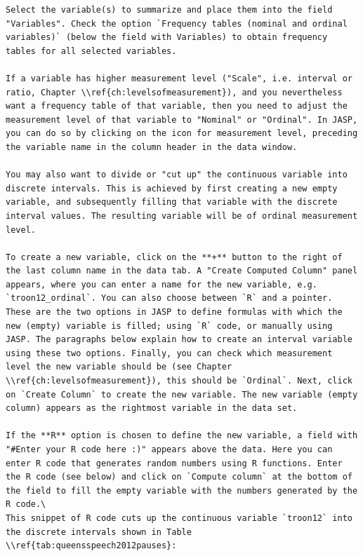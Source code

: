 \documentclass[
]{book}
\begin{document}
\begin{verbatim}
Select the variable(s) to summarize and place them into the field "Variables". Check the option `Frequency tables (nominal and ordinal variables)` (below the field with Variables) to obtain frequency tables for all selected variables. 

If a variable has higher measurement level ("Scale", i.e. interval or ratio, Chapter \\ref{ch:levelsofmeasurement}), and you nevertheless want a frequency table of that variable, then you need to adjust the measurement level of that variable to "Nominal" or "Ordinal". In JASP, you can do so by clicking on the icon for measurement level, preceding the variable name in the column header in the data window. 

You may also want to divide or "cut up" the continuous variable into discrete intervals. This is achieved by first creating a new empty variable, and subsequently filling that variable with the discrete interval values. The resulting variable will be of ordinal measurement level. 

To create a new variable, click on the **+** button to the right of the last column name in the data tab. A "Create Computed Column" panel appears, where you can enter a name for the new variable, e.g. `troon12_ordinal`. You can also choose between `R` and a pointer. These are the two options in JASP to define formulas with which the new (empty) variable is filled; using `R` code, or manually using JASP. The paragraphs below explain how to create an interval variable using these two options. Finally, you can check which measurement level the new variable should be (see Chapter \\ref{ch:levelsofmeasurement}), this should be `Ordinal`. Next, click on `Create Column` to create the new variable. The new variable (empty column) appears as the rightmost variable in the data set. 

If the **R** option is chosen to define the new variable, a field with "#Enter your R code here :)" appears above the data. Here you can enter R code that generates random numbers using R functions. Enter the R code (see below) and click on `Compute column` at the bottom of the field to fill the empty variable with the numbers generated by the R code.\
This snippet of R code cuts up the continuous variable `troon12` into the discrete intervals shown in Table \\ref{tab:queensspeech2012pauses}:
\end{verbatim}
\end{document}
